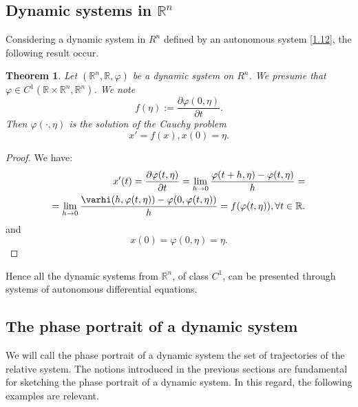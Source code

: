 \documentclass[a4paper, 11pt]{report}
\newtheorem{theorem}{Theorem}[subsection]
\newcommand{\R}{\mathbb{R}}
\begin{document}
\subsection{Dynamic systems in $\R^{n}$}
 Considering a dynamic system in $R^{n}$ defined by an autonomous system \eqref{1.12}, the following result occur.
 \begin{theorem}
  Let $(\R^{n},\R,\varphi)$ be a dynamic system on $R^{n}$. We presume that $\varphi\in C^{1}(\R\times\R^{n},\R^{n})$. We note $$f(\eta):=\frac{\partial \varphi(0,\eta)}{\partial t}.$$ Then $\varphi(\cdot,\eta)$ is the solution of the Cauchy problem 
  \begin{equation}\label{1.14}
   x'=f(x),x(0)=\eta.
  \end{equation}

 \end{theorem}
\begin{proof}
 We have:
 \begin{align*}
  x'(t)=\frac{\partial \varphi(t,\eta)}{\partial t}=\lim_{h\rightarrow 0}\frac{\varphi(t+h,\eta)-\varphi(t,\eta)}{h}=\\
  =\lim_{h\rightarrow 0}\frac{\varhi(h,\varphi(t,\eta))-\varphi(0,\varphi(t,\eta))}{h}=f(\varphi(t,\eta)), \forall t\in \R.
 \end{align*}
and $$x(0)=\varphi(0,\eta)=\eta.$$
\end{proof}
Hence all the dynamic systems from $\R^{n}$, of class $C^{1}$, can be presented through systems of autonomous differential equations.

\subsection{The phase portrait of a dynamic system}
 We will call the phase portrait of a dynamic system the set of trajectories of the relative system. The notions introduced in the previous sections are fundamental for sketching the phase portrait of a dynamic system. In this regard, the following examples are relevant.
\end{document}

